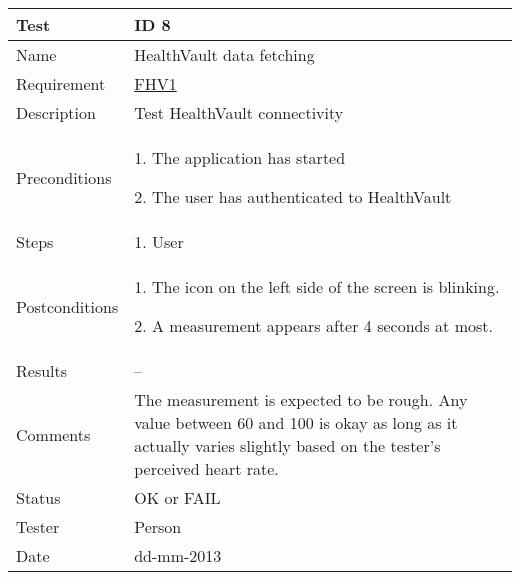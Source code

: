 \begin{table}
\begin{center}
\begin{tabular}{ | l | p{10cm} | }
	\hline
	\textbf{Test}	&	\textbf{ID 8} \\
	\hline\noalign{\smallskip}\noalign{\smallskip}\hline
	Name				& HealthVault data fetching \\
	Requirement			& \hyperref[table:reqweight]{FHV1} \\
	Description			& Test HealthVault connectivity \\
	Preconditions		&	\par 1. The application has started
							\par 2. The user has authenticated to HealthVault \\
	Steps 				&	\par 1. User \\
	Postconditions		&	\par 1. The icon on the left side of the screen is blinking.
							\par 2. A measurement appears after 4 seconds at most.\\
	Results				& -- \\
	Comments			&	The measurement is expected to be rough.
							Any value between 60 and 100 is okay as long as it actually varies slightly based
							on the tester's perceived heart rate.  \\
	Status				& OK or FAIL\\
	Tester				& Person \\
	Date				& dd-mm-2013 \\
	\hline
\end{tabular}
\end{center}
\end{table}

